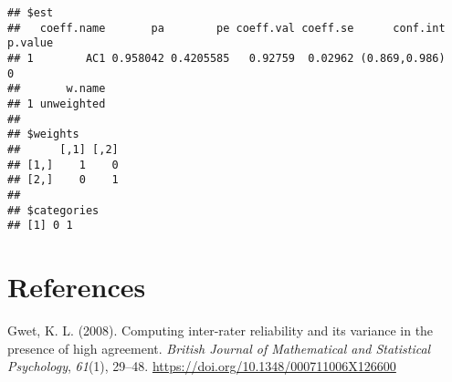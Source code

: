 \documentclass[
  man]{apa6}
\newlength{\cslhangindent}
\newlength{\cslentryspacingunit} %
\newenvironment{CSLReferences}[2] %
 {%
  \setlength{\parindent}{0pt}
  \ifodd #1
  \let\oldpar\par
  \def\par{\hangindent=\cslhangindent\oldpar}
  \fi
  \setlength{\parskip}{#2\cslentryspacingunit}
 }%
 {}
\begin{document}
\begin{verbatim}
## $est
##   coeff.name       pa        pe coeff.val coeff.se      conf.int p.value
## 1        AC1 0.958042 0.4205585   0.92759  0.02962 (0.869,0.986)       0
##       w.name
## 1 unweighted
## 
## $weights
##      [,1] [,2]
## [1,]    1    0
## [2,]    0    1
## 
## $categories
## [1] 0 1
\end{verbatim}

\newpage

\hypertarget{references}{%
\section{References}\label{references}}

\begingroup
\setlength{\parindent}{-0.5in}
\setlength{\leftskip}{0.5in}

\hypertarget{refs}{}
\begin{CSLReferences}{1}{0}
\leavevmode{}%
Gwet, K. L. (2008). Computing inter-rater reliability and its variance in the presence of high agreement. \emph{British Journal of Mathematical and Statistical Psychology}, \emph{61}(1), 29--48. \url{https://doi.org/10.1348/000711006X126600}

\end{CSLReferences}

\endgroup
\end{document}
